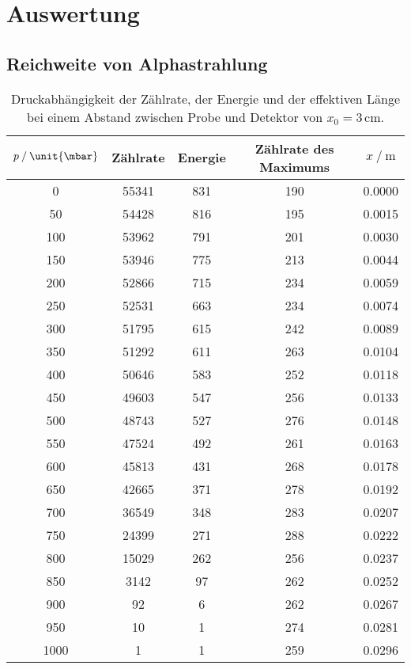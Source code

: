 \section{Auswertung}
\label{sec:Auswertung}



\subsection{Reichweite von Alphastrahlung}

\begin{table}
    \centering
    \caption{Druckabhängigkeit der Zählrate, der Energie und der effektiven Länge bei einem Abstand zwischen Probe und Detektor von $x_0 = 3\,\unit{\cm}$.}
\begin{tabular}{c c c c c}
    \toprule
    $p \mathbin{/}\unit{\mbar}$ &Zählrate& Energie & Zählrate des Maximums & $x \mathbin{/}\unit{\m}$ \\
    \midrule
                                     0&55341&831&190&0.0000 \\
                           50&54428&816&195&0.0015 \\
                           100&53962&791&201&0.0030 \\
                         150&53946&775&213&0.0044 \\
                         200&52866&715&234&0.0059 \\
                         250&52531&663&234&0.0074 \\
                         300&51795&615&242&0.0089 \\
                         350&51292&611&263&0.0104 \\
                         400&50646&583&252&0.0118 \\
                         450&49603&547&256&0.0133 \\
                         500&48743&527&276&0.0148 \\
                         550&47524&492&261&0.0163 \\
                         600&45813&431&268&0.0178 \\
                         650&42665&371&278&0.0192 \\
                         700&36549&348&283&0.0207 \\
                         750&24399&271&288&0.0222 \\
                         800&15029&262&256&0.0237 \\
                           850&3142&97&262&0.0252 \\
                              900&92&6&262&0.0267 \\
                              950&10&1&274&0.0281 \\
                              1000&1&1&259&0.0296 \\
    \bottomrule
    \end{tabular}
    \label{tab:3cm}
\end{table}